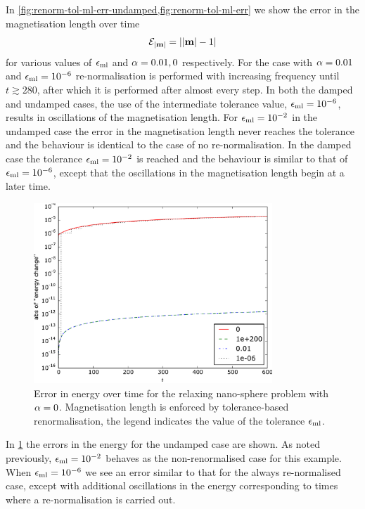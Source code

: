 In \cref{fig:renorm-tol-ml-err-undamped,fig:renorm-tol-ml-err} we show the error in the magnetisation length over time
\begin{equation}
  \mathcal{E}_{\left|{\boldsymbol{\mathrm{m}}} \right|} = \left|{\left|{\boldsymbol{\mathrm{m}}} \right| - 1} \right|
\end{equation}
for various values of $\epsilon_{\mathrm{ml}}$ and $\alpha=0.01, 0$ respectively.
For the case with $\alpha = 0.01$ and $\epsilon_{\mathrm{ml}} = 10^{-6}$ re-normalisation is performed with increasing frequency until $t \gtrsim 280$, after which it is performed after almost every step.
In both the damped and undamped cases, the use of the intermediate tolerance value, $\epsilon_{\mathrm{ml}} = 10^{-6}$, results in oscillations of the magnetisation length.
For $\epsilon_{\mathrm{ml}} = 10^{-2}$ in the undamped case the error in the magnetisation length never reaches the tolerance and the behaviour is identical to the case of no re-normalisation.
In the damped case the tolerance $\epsilon_{\mathrm{ml}} = 10^{-2}$ is reached and the behaviour is similar to that of $\epsilon_{\mathrm{ml}} = 10^{-6}$, except that the oscillations in the magnetisation length begin at a later time.


\begin{figure}
  \centering
  \includegraphics[width=0.8\textwidth]{plots/tolrenorm-geom-properties/0-absofenergychangevstimes.pdf}
  \caption{
    Error in energy over time
    for the relaxing nano-sphere problem
    with $\alpha = 0$.
    Magnetisation length is enforced by tolerance-based renormalisation,
    the legend indicates the value of the tolerance $\epsilon_{\mathrm{ml}}$.
  }
  \label{fig:renorm-tol-energy-err}
\end{figure}

In \cref{fig:renorm-tol-energy-err} the errors in the energy for the undamped case are shown.
As noted previously, $\epsilon_{\mathrm{ml}}= 10^{-2}$ behaves as the non-renormalised case for this example.
When $\epsilon_{\mathrm{ml}} = 10^{-6}$ we see an error similar to that for the always re-normalised case, except with additional oscillations in the energy corresponding to times where a re-normalisation is carried out.


